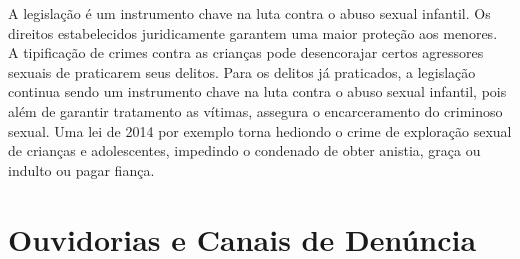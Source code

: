 
A legislação é um instrumento chave na luta contra o abuso sexual infantil. Os direitos estabelecidos juridicamente garantem uma maior proteção aos menores. A tipificação de crimes contra as crianças pode desencorajar certos agressores sexuais de praticarem seus delitos. Para os delitos já praticados, a legislação continua sendo um instrumento chave na luta contra o abuso sexual infantil, pois além de garantir tratamento as vítimas, assegura o encarceramento do criminoso sexual. Uma lei de 2014 por exemplo %
torna hediondo o crime de exploração sexual de crianças e adolescentes, impedindo o condenado de obter anistia, graça ou indulto ou pagar fiança.


\section{Ouvidorias e Canais de Denúncia}\label{sec:canais}



